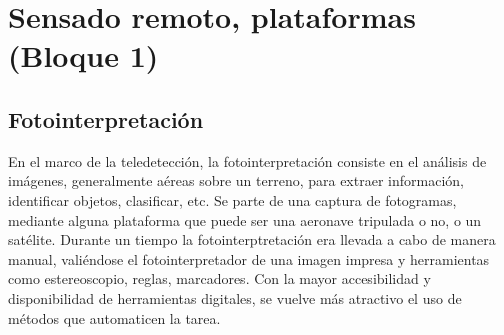 \section{Sensado remoto, plataformas (Bloque 1)}
\subsection{Fotointerpretación}
En el marco de la teledetección, la fotointerpretación consiste en el análisis de imágenes, generalmente aéreas sobre un terreno, para extraer información, identificar objetos, clasificar, etc. Se parte de una captura de fotogramas, mediante alguna plataforma que puede ser una aeronave tripulada o no, o un satélite. Durante un tiempo la fotointerptretación era llevada a cabo de manera manual, valiéndose el fotointerpretador de una imagen impresa y herramientas como estereoscopio, reglas, marcadores. Con la mayor accesibilidad y disponibilidad de herramientas digitales, se vuelve más atractivo el uso de métodos que automaticen la tarea.

